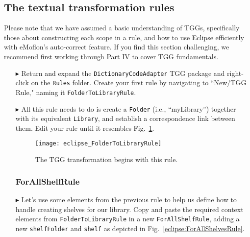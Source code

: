 \newpage
\hypertarget{treeToModel tex}{}
\subsection{The textual transformation rules}
\texHeader

Please note that we have assumed a basic understanding of TGGs, specifically those about constructing each scope in a rule, and how to use Eclipse efficiently
with eMoflon's auto-correct feature. If you find this section challenging, we recommend first working through Part IV to cover TGG fundamentals.

\begin{itemize}

\subsubsection{FolderToLibraryRule} %

\item[$\blacktriangleright$] Return and expand the \texttt{DictionaryCodeAdapter} TGG package and right-click on the \texttt{Rules} folder. Create your first
rule by navigating to ``New/TGG Rule," naming it \texttt{Folder\-To\-Lib\-rary\-Rule}.

\item[$\blacktriangleright$] All this rule needs to do is create a \texttt{Folder} (i.e., ``myLibrary'') together with its equivalent \texttt{Library}, and
establish a correspondence link between them. Edit your rule until it resembles Fig.~\ref{eclipse:FolderToLibraryRule}.

\vspace{0.5cm}

\begin{figure}[htbp]
\begin{center}
  \texttt{[image: eclipse\_FolderToLibraryRule]}
  \caption{The TGG transformation begins with this rule.}
  \label{eclipse:FolderToLibraryRule}
\end{center}
\end{figure}

\vspace{-0.5cm}

\subsubsection{ForAllShelfRule} %

\item[$\blacktriangleright$] Let's use some elements from the previous rule to help us define how to handle creating shelves for our library. Copy and paste the
required context elements from \texttt{FolderToLibraryRule} in a new \texttt{ForAllShelfRule}, adding a new \texttt{shelfFolder} and \texttt{shelf} as depicted
in Fig.~\ref{eclipse:ForAllShelvesRule}.


\end{itemize}
